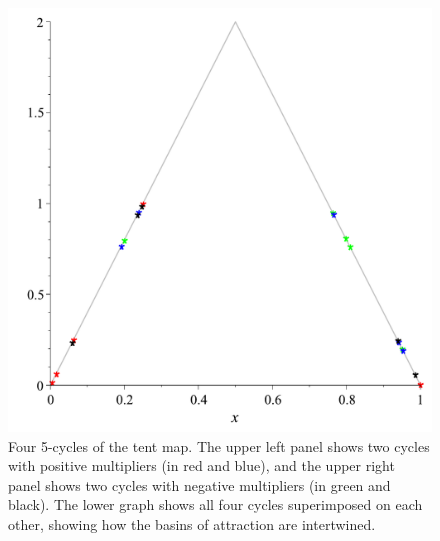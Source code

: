 \documentclass[12pt,a4paper]{amsart}
\begin{document}
\begin{figure}[h!]
\hspace{1cm}
\includegraphics[scale=0.28]{Fig4}
\caption{Four 5-cycles of the tent map.  The upper left panel shows two cycles with positive multipliers (in red and blue), and the upper right panel shows two cycles with negative multipliers (in green and black). The lower graph shows all four cycles superimposed on each other, showing how the basins of attraction are intertwined.} \label{f1}
\end{figure}
\end{document}
